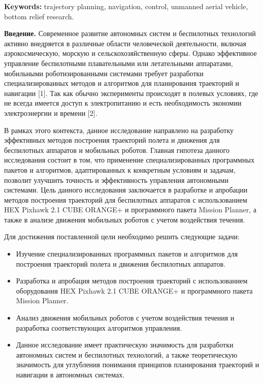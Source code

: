 {\bfseries Keywords:} trajectory planning, navigation, control, unmanned
aerial vehicle, bottom relief research.
\begin{multicols}{2}

{\bfseries Введение.} Современное развитие автономных систем и беспилотных
технологий активно внедряется в различные области человеческой
деятельности, включая аэрокосмическую, морскую и сельскохозяйственную
сферы. Однако эффективное управление беспилотными плавательными или
летательными аппаратами, мобильными роботизированными системами требует
разработки специализированных методов и алгоритмов для планирования
траекторий и навигации {[}1{]}. Так как обычно эксперименты происходят в
полевых условиях, где не всегда имеется доступ к электропитанию и есть
необходимость экономии электроэнергии и времени {[}2{]}.

В рамках этого контекста, данное исследование направлено на разработку
эффективных методов построения траекторий полета и движения для
беспилотных аппаратов и мобильных роботов. Главная гипотеза данного
исследования состоит в том, что применение специализированных
программных пакетов и алгоритмов, адаптированных к конкретным условиям и
задачам, позволит улучшить точность и эффективность управления
автономными системами. Цель данного исследования заключается в
разработке и апробации методов построения траекторий для беспилотных
аппаратов с использованием HEX Pixhawk 2.1 CUBE ORANGE+ и программного
пакета Mission Planner, а также в анализе движения мобильных роботов с
учетом воздействия течения.

Для достижения поставленной цели необходимо решить следующие задачи:

\begin{itemize}
\item
  Изучение специализированных программных пакетов и алгоритмов для
  построения траекторий полета и движения беспилотных аппаратов.
\item
  Разработка и апробация методов построения траекторий с использованием
  оборудования HEX Pixhawk 2.1 CUBE ORANGE+ и программного пакета
  Mission Planner.
\item
  Анализ движения мобильных роботов с учетом воздействия течения и
  разработка соответствующих алгоритмов управления.
\item
  Данное исследование имеет практическую значимость для разработки
  автономных систем и беспилотных технологий, а также теоретическую
  значимость для углубления понимания принципов планирования траекторий
  и навигации в автономных системах.
\end{itemize}


\end{multicols}
